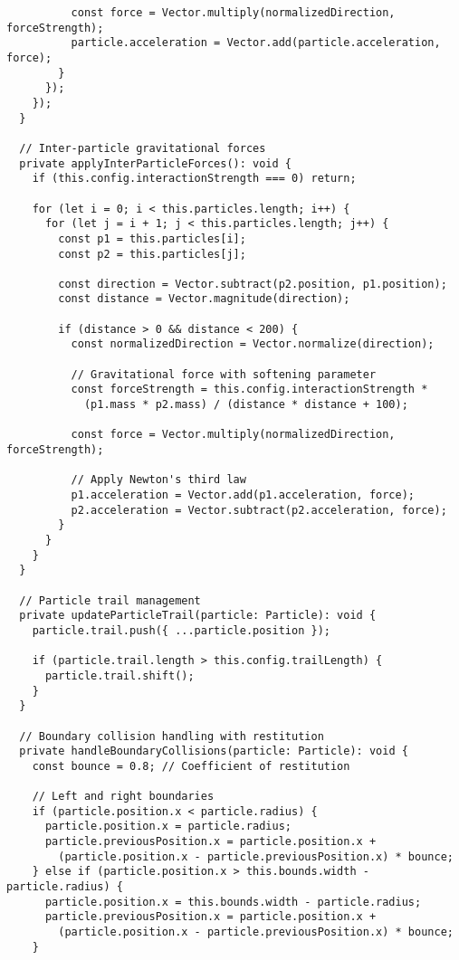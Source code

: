 \documentclass[12pt,journal,onecolumn]{IEEEtran}
\begin{document}
\begin{verbatim}
          const force = Vector.multiply(normalizedDirection, forceStrength);
          particle.acceleration = Vector.add(particle.acceleration, force);
        }
      });
    });
  }

  // Inter-particle gravitational forces
  private applyInterParticleForces(): void {
    if (this.config.interactionStrength === 0) return;

    for (let i = 0; i < this.particles.length; i++) {
      for (let j = i + 1; j < this.particles.length; j++) {
        const p1 = this.particles[i];
        const p2 = this.particles[j];
        
        const direction = Vector.subtract(p2.position, p1.position);
        const distance = Vector.magnitude(direction);
        
        if (distance > 0 && distance < 200) {
          const normalizedDirection = Vector.normalize(direction);
          
          // Gravitational force with softening parameter
          const forceStrength = this.config.interactionStrength * 
            (p1.mass * p2.mass) / (distance * distance + 100);
          
          const force = Vector.multiply(normalizedDirection, forceStrength);
          
          // Apply Newton's third law
          p1.acceleration = Vector.add(p1.acceleration, force);
          p2.acceleration = Vector.subtract(p2.acceleration, force);
        }
      }
    }
  }

  // Particle trail management
  private updateParticleTrail(particle: Particle): void {
    particle.trail.push({ ...particle.position });
    
    if (particle.trail.length > this.config.trailLength) {
      particle.trail.shift();
    }
  }

  // Boundary collision handling with restitution
  private handleBoundaryCollisions(particle: Particle): void {
    const bounce = 0.8; // Coefficient of restitution
    
    // Left and right boundaries
    if (particle.position.x < particle.radius) {
      particle.position.x = particle.radius;
      particle.previousPosition.x = particle.position.x + 
        (particle.position.x - particle.previousPosition.x) * bounce;
    } else if (particle.position.x > this.bounds.width - particle.radius) {
      particle.position.x = this.bounds.width - particle.radius;
      particle.previousPosition.x = particle.position.x + 
        (particle.position.x - particle.previousPosition.x) * bounce;
    }
    

\end{verbatim}
\end{document}
